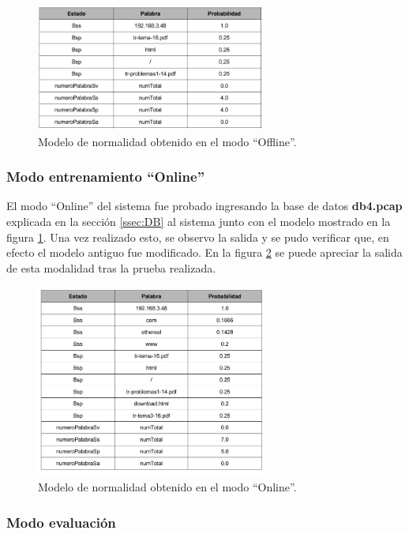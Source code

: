\begin{figure}[!htb]
\begin{center}
\includegraphics[width=3in]{./img/modeloOffline.jpg}
\caption{Modelo de normalidad obtenido en el modo ``Offline''.}
\label{fig:modeloOffline}
\end{center}
\end{figure}

\subsubsection{Modo entrenamiento ``Online''}

El modo ``Online'' del sistema fue probado ingresando la base de datos \textbf{db4.pcap} explicada en la sección \ref{ssec:DB} al sistema junto con el modelo mostrado en la figura \ref{fig:modeloOffline}. Una vez realizado esto, se observo la salida y se pudo verificar que, en efecto el modelo antiguo fue modificado. En la figura \ref{fig:modeloOnline} se puede apreciar la salida de esta modalidad tras la prueba realizada.

\begin{figure}[!htb]
\begin{center}
\includegraphics[width=3in]{./img/modeloOnline.jpg}
\caption{Modelo de normalidad obtenido en el modo ``Online''.}
\label{fig:modeloOnline}
\end{center}
\end{figure}

\subsubsection{Modo evaluación}

